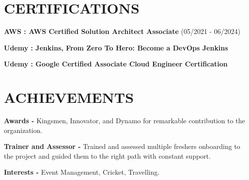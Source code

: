 \documentclass[letterpaper,11pt]{article}
\begin{document}
\section{CERTIFICATIONS}
 \begin{itemize}[leftmargin=0.3in]
   \setlength{\itemsep}{1pt}
   \setlength{\parskip}{0pt}
   \setlength{\parsep}{0pt}
    \small{\item{
    \textbf{AWS : AWS Certified Solution Architect Associate} {(05/2021 - 06/2024)}\vspace{2pt} \\}
    \item{\textbf{Udemy : Jenkins, From Zero To Hero: Become a DevOps Jenkins} \\}
    \item{\textbf{Udemy : Google Certified Associate Cloud Engineer Certification}\vspace{2pt} \\
    }
    }
 \end{itemize}
 
\section{ACHIEVEMENTS}
 \begin{itemize}[leftmargin=0.3in]
  \setlength{\itemsep}{1pt}
  \setlength{\parskip}{0pt}
  \setlength{\parsep}{0pt}
    \small{\item{
    \textbf{Awards -} {Kingsmen, Innovator, and Dynamo for remarkable contribution to the organization.} \vspace{0pt} \\}
    \item{\textbf{Trainer and Assessor -} {Trained and assessed multiple freshers onboarding to the project and guided them to the right path with constant support.} \vspace{0pt} \\}
    \item{\textbf{Interests -} {Event Management, Cricket, Travelling.} \vspace{0pt} \\
    }
    }
 \end{itemize}
\end{document}
